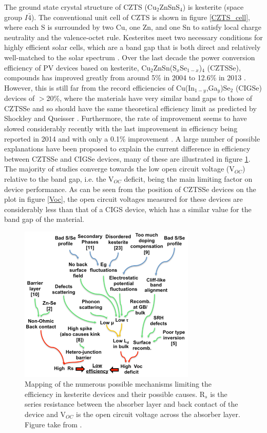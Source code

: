 The ground state crystal structure of CZTS (Cu$_{2}$ZnSnS$_{4}$) is kesterite (space group $I\bar{4}$). The conventional unit cell of CZTS is shown in figure \ref{CZTS_cell}, where each S is surrounded by two Cu, one Zn, and one Sn to satisfy local charge neutrality and the valence-octet rule.
Kesterites meet two necessary conditions for highly efficient solar cells, which are a band gap that is both direct and relatively well-matched to the solar spectrum \cite{CZTS_book}.
Over the last decade the power conversion efficiency of PV devices based on kesterite, Cu$_2$ZnSn(S$_x$Se$_{1-x}$)$_4$ (CZTSSe), compounds has improved greatly from around 5\% in 2004 to 12.6\% in 2013 \cite{culprit_2}. However, this is still far from the record efficiencies of Cu(In$_{1-y}$,Ga$_y$)Se$_2$ (CIGSe) devices of $>$20\%, where the materials have very similar band gaps to those of CZTSSe \cite{culprit} and so should have the same theoretical efficiency limit as predicted by Shockley and Queisser \cite{SQ_1961}. Furthermore, the rate of improvement seems to have slowed considerably recently with the last improvement in efficiency being reported in 2014 and with only a 0.1\% improvement \cite{culprit_3}. A large number of possible explanations have been proposed to explain the current difference in efficiency between CZTSSe and CIGSe devices, many of these are illustrated in figure \ref{kesterite_bottlenecks}. The majority of studies converge towards the low open circuit voltage (V$_{OC}$) relative to the band gap, i.e. the V$_{OC}$ deficit, being the main limiting factor on device performance. As can be seen from the position of CZTSSe devices on the plot in figure \ref{Voc}, the open circuit voltages measured for these devices are considerably less than that of a CIGS device, which has a similar value for the band gap of the material.

\begin{figure}[h!]
  \centering
    \includegraphics[width=0.75\textwidth]{figures/kesterite_bottlenecks.png}
    \caption{Mapping of the numerous possible mechanisms limiting the efficiency in kesterite devices and their possible causes. R$_s$ is the series resistance between the absorber layer and back contact of the device and V$_{OC}$ is the open circuit voltage across the absorber layer. Figure take from .}
  \label{kesterite_bottlenecks}
\end{figure}

